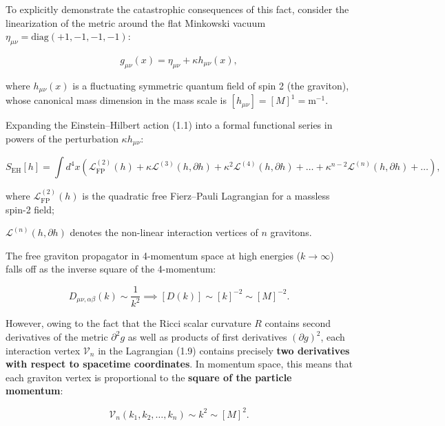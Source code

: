 \documentclass[11pt,a4paper]{article}
\theoremstyle{definition}
\begin{document}
To explicitly demonstrate the catastrophic consequences of this fact, consider the linearization of the metric around the flat Minkowski vacuum $\eta_{\mu\nu} = \text{diag}(+1, -1, -1, -1)$:

\begin{equation}\label{eq:1.8}\tag{1.8}
g_{\mu\nu}(x) = \eta_{\mu\nu} + \kappa h_{\mu\nu}(x),
\end{equation}

where $h_{\mu\nu}(x)$ is a fluctuating symmetric quantum field of spin 2 (the graviton), whose canonical mass dimension in the mass scale is $[h_{\mu\nu}] = [M]^1 = \text{m}^{-1}$.

Expanding the Einstein--Hilbert action (1.1) into a formal functional series in powers of the perturbation $\kappa h_{\mu\nu}$:

\begin{equation}\label{eq:1.9}\tag{1.9}
S_{\text{EH}}[h] = \int d^4x \left( \mathcal{L}^{(2)}_{\text{FP}}(h) + \kappa \mathcal{L}^{(3)}(h, \partial h) + \kappa^2 \mathcal{L}^{(4)}(h, \partial h) + \dots + \kappa^{n-2} \mathcal{L}^{(n)}(h, \partial h) + \dots \right),
\end{equation}

where $\mathcal{L}^{(2)}_{\text{FP}}(h)$ is the quadratic free Fierz--Pauli Lagrangian for a massless spin-2 field;  

$\mathcal{L}^{(n)}(h, \partial h)$ denotes the non-linear interaction vertices of $n$ gravitons.

The free graviton propagator in 4-momentum space at high energies ($k \to \infty$) falls off as the inverse square of the 4-momentum:

\begin{equation}\label{eq:1.10}\tag{1.10}
D_{\mu\nu,\alpha\beta}(k) \sim \frac{1}{k^2} \implies [D(k)] \sim [k]^{-2} \sim [M]^{-2}.
\end{equation}

However, owing to the fact that the Ricci scalar curvature $R$ contains second derivatives of the metric $\partial^2 g$ as well as products of first derivatives $(\partial g)^2$, each interaction vertex $\mathcal{V}_n$ in the Lagrangian (1.9) contains precisely \textbf{two derivatives with respect to spacetime coordinates}. In momentum space, this means that each graviton vertex is proportional to the \textbf{square of the particle momentum}:

\begin{equation}\label{eq:1.11}\tag{1.11}
\mathcal{V}_n(k_1, k_2, \dots, k_n) \sim k^2 \sim [M]^2.
\end{equation}
\end{document}
